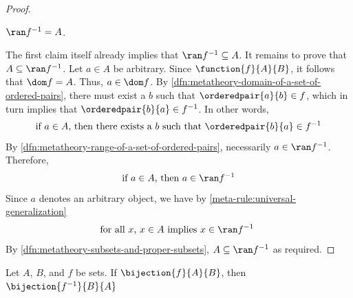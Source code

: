 \begin{proof}
    \begin{claim}
         \label{claim:range-of-f-inverse-is-A}
        \( \ran f^{-1} = A \).
    \end{claim}
    \noindent
    The first claim itself already implies that \( \ran f^{-1} \subseteq A \).
    It remains to prove that \( A \subseteq \ran f^{-1} \).
    Let \( a \in A \) be arbitrary.
    Since \( \function{f}{A}{B} \), it follows that \( \dom f = A \).
    Thus, \( a \in \dom f \).
    By \cref{dfn:metatheory-domain-of-a-set-of-ordered-pairs}, there must exist a \( b \) such that
    \( \orderedpair{a}{b} \in f \), which in turn implies that \( \orderedpair{b}{a} \in f^{-1} \).
    In other words,
    \begin{equation*}
        \text{if \( a \in A \), then there exists a \( b \) such that \( \orderedpair{b}{a} \in f^{-1} \)}
    \end{equation*}
    By \cref{dfn:metatheory-range-of-a-set-of-ordered-pairs}, necessarily \( a \in \ran f^{-1} \).
    Therefore,
    \begin{equation*}
        \text{if \( a \in A \), then \( a \in \ran f^{-1} \)}
    \end{equation*}
    Since \( a \) denotes an arbitrary object, we have by \cref{meta-rule:universal-generalization}
    \begin{equation*}
        \text{for all \( x \), \( x \in A \) implies \( x \in \ran f^{-1} \) }
    \end{equation*}
    By \cref{dfn:metatheory-subsets-and-proper-subsets}, \( A \subseteq \ran f^{-1} \) as required.
\end{proof}

\begin{thm}
     \label{thm:metatheory-inverse-of-bijection-is-another-bijection}
    Let \( A \), \( B \), and \( f \) be sets.
    If \( \bijection{f}{A}{B} \), then \( \bijection{f^{-1}}{B}{A} \)
\end{thm}


